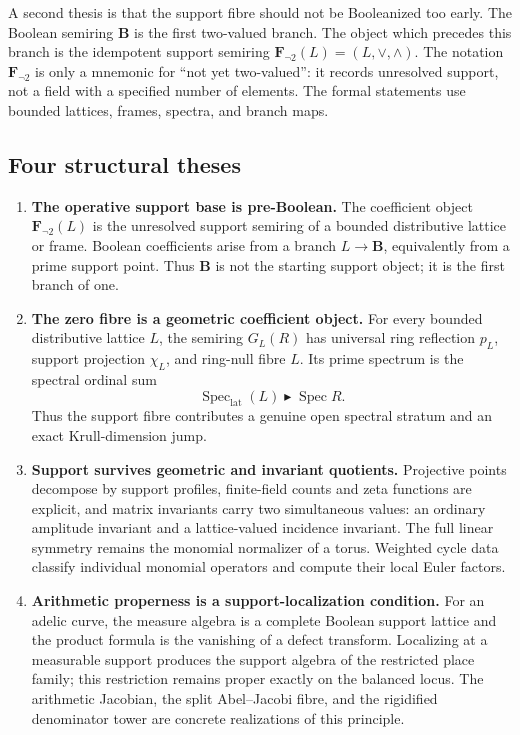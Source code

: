 \documentclass[11pt]{amsart}
\numberwithin{equation}{section}
\theoremstyle{definition}
\newcommand{\Fnot}{\mathbf F_{\neg 2}}
\newcommand{\Spec}{\operatorname{Spec}}
\newcommand{\SpecLat}{\operatorname{Spec}_{\mathrm{lat}}}
\begin{document}
A second thesis is that the support fibre should not be Booleanized too
early.  The Boolean semiring $\mathbf B$ is the first two-valued branch.
The object which precedes this branch is the idempotent support semiring
$\Fnot(L)=(L,\vee,\wedge)$.  The notation $\Fnot$ is only a mnemonic for
``not yet two-valued'': it records unresolved support, not a field with a
specified number of elements.  The formal statements use bounded
lattices, frames, spectra, and branch maps.

\subsection*{Four structural theses}

\begin{enumerate}[label=\textbf{T\arabic*.},leftmargin=3.8em]
\item \textbf{The operative support base is pre-Boolean.}
The coefficient object $\Fnot(L)$ is the unresolved support semiring of a
bounded distributive lattice or frame.  Boolean coefficients arise from a
branch $L\to\mathbf B$, equivalently from a prime support point.  Thus
$\mathbf B$ is not the starting support object; it is the first branch of
one.

\item \textbf{The zero fibre is a geometric coefficient object.}
For every bounded distributive lattice $L$, the semiring $G_L(R)$ has
universal ring reflection $p_L$, support projection $\chi_L$, and
ring-null fibre $L$.  Its prime spectrum is the spectral ordinal sum
\[
\SpecLat(L)\blacktriangleright\Spec R.
\]
Thus the support fibre contributes a genuine open spectral stratum and an
exact Krull-dimension jump.

\item \textbf{Support survives geometric and invariant quotients.}
Projective points decompose by support profiles, finite-field counts and
zeta functions are explicit, and matrix invariants carry two simultaneous
values: an ordinary amplitude invariant and a lattice-valued incidence
invariant.  The full linear symmetry remains the monomial normalizer of a
torus.  Weighted cycle data classify individual monomial operators and
compute their local Euler factors.

\item \textbf{Arithmetic properness is a support-localization condition.}
For an adelic curve, the measure algebra is a complete Boolean support
lattice and the product formula is the vanishing of a defect transform.
Localizing at a measurable support produces the support algebra of the
restricted place family; this restriction remains proper exactly on the
balanced locus.  The arithmetic Jacobian, the split Abel--Jacobi fibre, and
the rigidified denominator tower are concrete realizations of this
principle.


\end{enumerate}
\end{document}
